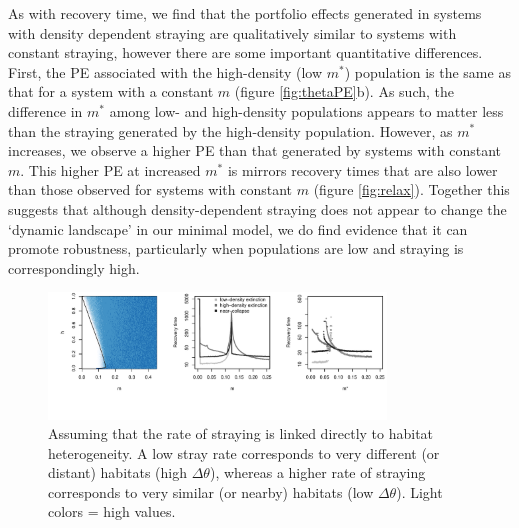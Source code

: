\documentclass[twocolumn,preprintnumbers,amsmath,amssymb,superscriptaddress]{revtex4}
\begin{document}
As with recovery time, we find that the portfolio effects generated in systems with density dependent straying are qualitatively similar to systems with constant straying, however there are some important quantitative differences.
First, the PE associated with the high-density (low $m^*$) population is the same as that for a system with a constant $m$ (figure \ref{fig:thetaPE}b).
As such, the difference in $m^*$ among low- and high-density populations appears to matter less than the straying generated by the high-density population.
However, as $m^*$ increases, we observe a higher PE than that generated by systems with constant $m$.
This higher PE at increased $m^*$ is mirrors recovery times that are also lower than those observed for systems with constant $m$ (figure \ref{fig:relax}).
Together this suggests that although density-dependent straying does not appear to change the `dynamic landscape' in our minimal model, we do find evidence that it can promote robustness, particularly when populations are low and straying is correspondingly high.
% 
% 
% 
% 
% 
% 
\\

\begin{figure}
  \captionsetup{justification=raggedright,
singlelinecheck=false
}
  \centering
  \includegraphics[width=0.8\textwidth]{figs2/fig_MDPE_hm_mtheta_rt.pdf}
  \caption{
  Assuming that the rate of straying is linked directly to habitat heterogeneity. A low stray rate corresponds to very different (or distant) habitats (high $\Delta\theta$), whereas a higher rate of straying corresponds to very similar (or nearby) habitats (low $\Delta\theta$). Light colors = high values.
  } \label{fig:mtheta}
\end{figure}
\end{document}
